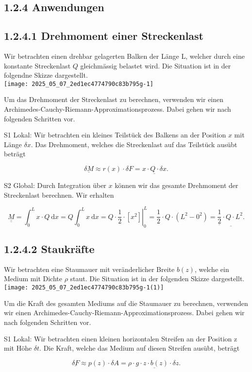 \documentclass[10pt]{article}
\begin{document}
\subsection*{1.2.4 Anwendungen}
\subsection*{1.2.4.1 Drehmoment einer Streckenlast}
Wir betrachten einen drehbar gelagerten Balken der Länge L, welcher durch eine konstante Streckenlast $Q$ gleichmässig belastet wird. Die Situation ist in der folgendne Skizze dargestellt.\\
\texttt{[image: 2025\_05\_07\_2ed1ec4774790c83b795g-1]}

Um das Drehmoment der Streckenlast zu berechnen, verwenden wir einen Archimedes-Cauchy-Riemann-Approximationsprozess. Dabei gehen wir nach folgenden Schritten vor.

S1 Lokal: Wir betrachten ein kleines Teilstück des Balkens an der Position $x$ mit Länge $\delta x$. Das Drehmoment, welches die Streckenlast auf das Teilstück ausübt beträgt


\begin{equation*}
\underline{\delta M} \approx r(x) \cdot \delta F=\underline{x \cdot Q \cdot \delta x} . \tag{1.11}
\end{equation*}


S2 Global: Durch Integration über $x$ können wir das gesamte Drehmoment der Streckenlast berechnen. Wir erhalten


\begin{equation*}
\underline{\underline{M}}=\int_{0}^{L} x \cdot Q \mathrm{~d} x=Q \int_{0}^{L} x \mathrm{~d} x=\left.Q \cdot \frac{1}{2} \cdot\left[x^{2}\right]\right|_{0} ^{L}=\frac{1}{2} \cdot Q \cdot\left(L^{2}-0^{2}\right)=\underline{\underline{\frac{1}{2}} \cdot Q \cdot L^{2} .} \tag{1.12}
\end{equation*}


\subsection*{1.2.4.2 Staukräfte}
Wir betrachten eine Staumauer mit veränderlicher Breite $b(z)$, welche ein Medium mit Dichte $\rho$ staut. Die Situation ist in der folgenden Skizze dargestellt.\\
\texttt{[image: 2025\_05\_07\_2ed1ec4774790c83b795g-1(1)]}

Um die Kraft des gesamten Mediums auf die Staumauer zu berechnen, verwenden wir einen Archimedes-Cauchy-Riemann-Approximationsprozess. Dabei gehen wir nach folgenden Schritten vor.

S1 Lokal: Wir betrachten einen kleinen horizontalen Streifen an der Position z mit Höhe $\delta t$. Die Kraft, welche das Medium auf diesen Streifen ausübt, beträgt


\begin{equation*}
\underline{\delta F} \approx p(z) \cdot \delta A=\underline{\rho \cdot g \cdot z \cdot b(z) \cdot \delta z .} \tag{1.13}
\end{equation*}
\end{document}
